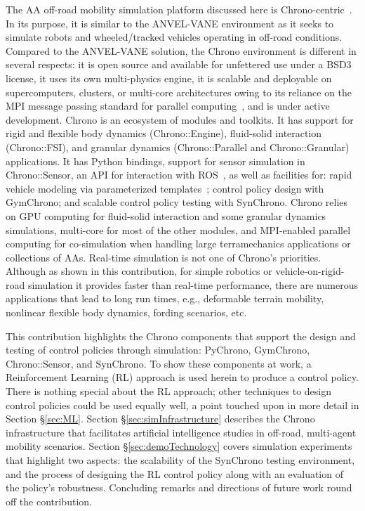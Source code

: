 \documentclass[12pt,twocolumn]{article}
\begin{document}
The AA off-road mobility simulation platform discussed here is Chrono-centric~\cite{projectChronoWebSite,chronoOverview2016}. In its purpose, it is similar to the ANVEL-VANE environment as it seeks to simulate robots and wheeled/tracked vehicles operating in off-road conditions. Compared to the ANVEL-VANE solution, the Chrono environment is different in several respects: it is open source and available for unfettered use under a BSD3 license, it uses its own multi-physics engine, it is scalable and deployable on supercomputers, clusters, or multi-core architectures owing to its reliance on the MPI message passing standard for parallel computing~\cite{MPI-Forum-1994}, and is under active development. Chrono is an ecosystem of modules and toolkits. It has support for rigid and flexible body dynamics (Chrono::Engine), fluid-solid interaction (Chrono::FSI), and granular dynamics (Chrono::Parallel and Chrono::Granular) applications. It has Python bindings, support for sensor simulation in Chrono::Sensor, an API for interaction with ROS~\cite{ROS-2009}, as well as facilities for: rapid vehicle modeling via parameterized templates~\cite{ChronoVehicle2019}; control policy design with GymChrono; and scalable control policy testing with SynChrono. Chrono relies on GPU computing for fluid-solid interaction and some granular dynamics simulations, multi-core for most of the other modules, and MPI-enabled parallel computing for co-simulation when handling large terramechanics applications or collections of AAs. Real-time simulation is not one of Chrono's priorities. Although as shown in this contribution, for simple robotics or vehicle-on-rigid-road simulation it provides faster than real-time performance, there are numerous applications that lead to long run times, e.g., deformable terrain mobility, nonlinear flexible body dynamics, fording scenarios, etc. 

This contribution highlights the Chrono components that support the design and testing of control policies through simulation: PyChrono, GymChrono, Chrono::Sensor, and SynChrono. To show these components at work, a Reinforcement Learning (RL) approach is used herein to produce a control policy. There is nothing special about the RL approach; other techniques to design control policies could be used equally well, a point touched upon in more detail in Section \S\ref{sec:ML}. Section \S\ref{sec:simInfrastructure} describes the Chrono infrastructure that facilitates artificial intelligence studies in off-road, multi-agent mobility scenarios. Section \S\ref{sec:demoTechnology} covers simulation experiments that highlight two aspects: the scalability of the SynChrono testing environment, and the process of designing the RL control policy along with an evaluation of the policy's robustness. Concluding remarks and directions of future work round off the contribution. 
\end{document}
